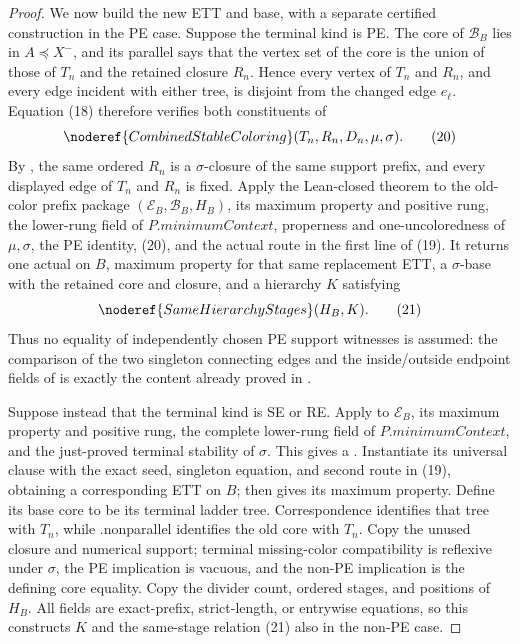\begin{proof}
We now build the new ETT and base, with a separate certified construction
in the PE case.  Suppose the terminal kind is PE.  The core of
\(\mathcal B_B\) lies in \(A\preccurlyeq X^-\), and its parallel
 says that the vertex set of the core is the
union of those of \(T_n\) and the retained closure \(R_n\).  Hence every
vertex of \(T_n\) and \(R_n\), and every edge incident with either tree,
is disjoint from the changed edge \(e_\ell\).  Equation (18) therefore
verifies both  constituents of
\[
 \noderef{CombinedStableColoring}(T_n,R_n,D_n,\mu,\sigma).      \tag{20}
\]
By , the same ordered \(R_n\) is
a \(\sigma\)-closure of the same support prefix, and every displayed edge
of \(T_n\) and \(R_n\) is fixed.  Apply the Lean-closed theorem
 to the old-color prefix package
\((\mathcal E_B,\mathcal B_B,H_B)\), its maximum property and positive
rung, the lower-rung field of \(P.\mathit{minimumContext}\), properness and
one-uncoloredness of \(\mu,\sigma\), the PE identity, (20), and the actual
route in the first line of (19).  It returns one actual
 on \(B\), maximum property
for that same replacement ETT, a \(\sigma\)-base with the retained core and
closure, and a hierarchy \(K\) satisfying
\[
                  \noderef{SameHierarchyStages}(H_B,K).        \tag{21}
\]
Thus no equality of independently chosen PE support witnesses is assumed:
the comparison of the two singleton connecting edges and the inside/outside
endpoint fields of  is exactly the content
already proved in .

Suppose instead that the terminal kind is SE or RE.  Apply  to
\(\mathcal E_B\), its maximum property and positive rung, the complete
lower-rung field of \(P.\mathit{minimumContext}\), and the just-proved
terminal stability of \(\sigma\).  This gives a
.  Instantiate its universal clause with the exact
seed, singleton equation, and second route in (19), obtaining a
corresponding ETT on \(B\); then
 gives its maximum property.  Define its
base core to be its terminal ladder tree.  Correspondence identifies that
tree with \(T_n\), while .nonparallel identifies the
old core with \(T_n\).  Copy the unused closure and numerical support;
terminal missing-color compatibility is reflexive under \(\sigma\), the PE
implication is vacuous, and the non-PE implication is the defining core
equality.  Copy the divider count, ordered stages, and positions of \(H_B\).
All  fields are exact-prefix, strict-length, or
entrywise equations, so this constructs \(K\) and the same-stage relation
(21) also in the non-PE case.


\end{proof}
